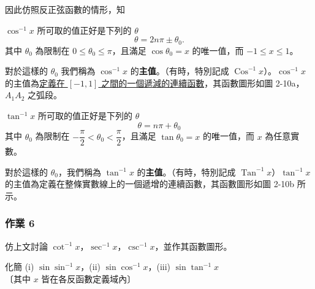 
因此仿照反正弦函數的情形，知

\medskip
\begin{prop}\label{prop:b5s-1-2}
$\cos^{-1} x$ 所可取的值正好是下列的 $\theta$
\[
\theta = 2n\pi \pm \theta_0.
\]
其中 $\theta_0$ 為限制在 $0 \le \theta_0 \le \pi$，且滿足 $\cos \theta_0 = x$ 的唯一值，而 $-1 \le x \le 1$。
\end{prop}

對於這樣的 $\theta_0$ 我們稱為 $\cos^{-1} x$ 的\textbf{主值}。（有時，特別記成 $\operatorname{Cos}^{-1} x$）。$\cos^{-1} x$ 的主值為\underline{定義在 $[-1, 1]$ 之}\underline{間的一個遞減的連續函數}，其函數圖形如圖 2-10a，$A_1 A_2$ 之弧段。

\medskip
\begin{prop}\label{prop:b5s-1-3}
$\tan^{-1} x$ 所可取的值正好是下列的 $\theta$
\[
\theta = n\pi + \theta_0
\]
其中 $\theta_0$ 為限制在 \underline{$-\dfrac{\pi}{2} < \theta_0 < \dfrac{\pi}{2}$}，且滿足 $\tan \theta_0 = x$ 的唯一值，而 $x$ 為任意實數。
\end{prop}

對於這樣的 $\theta_0$，我們稱為 \underline{$\tan^{-1} x$} 的\textbf{主值}。（有時，特別記成 $\operatorname{Tan}^{-1} x$）$\tan^{-1} x$ 的主值為定義在整條實數線上的一個遞增的連續函數，其函數圖形如圖 2-10b 所示。

\medskip
\subsubsection*{作業 6}
仿上文討論 $\cot^{-1} x$，$\sec^{-1} x$，$\csc^{-1} x$，並作其函數圖形。

\medskip
\begin{example}\label{ex:b5s-1-2-1}
化簡 (i) $\sin \sin^{-1} x$，(ii) $\sin \cos^{-1} x$，(iii) $\sin \tan^{-1} x$ \\
〔其中 $x$ 皆在各反函數定義域內〕
\end{example}
